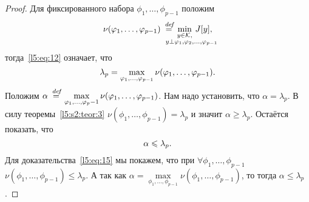 \documentclass[12pt,a4paper,openany,fleqn]{book}
\newcommand {\defeq}{\stackrel{\hspace{0.09 cm}de\!f}{=}}
\newcommand {\eqdef}{\defeq}
\newcommand{\mc}[1]{\ensuremath{\mathcal{#1}}}
\newcommand{\K}{\mc{K}}
\theoremstyle{definition}
\begin{document}
\begin{proof}
	Для фиксированного набора $\phi_1,\ldots,\phi_{p-1}$ положим
	\begin{equation}
		\label{l5:eq:13}
		\hfill\nu(\phi_1,\ldots,\phi_{p-1})\eqdef\min\limits_{\substack{y\in\K,\\\lefteqn{\scriptstyle \hspace*{-0.8cm}y\perp\phi_1,\phi_2,\ldots,\phi_{p-1}}}}\,J[y],\hfill
	\end{equation}
тогда~\eqref{l5:eq:12} означает, что
\begin{equation}
	\label{l5:eq:14}
	\hfill\lambda_p=\max\limits_{\phi_1,\ldots,\phi_{p-1}}\nu(\phi_1,\ldots,\phi_{p-1}).\hfill
\end{equation}
Положим $\displaystyle\alpha\eqdef\max\limits_{\phi_1,\ldots,\phi_p-1}\nu(\phi_1,\ldots,\phi_{p-1})$. Нам надо установить, что $\alpha=\lambda_p$. В силу теоремы~\ref{l5:s2:teor:3} $\nu(\phi_1,\ldots,\phi_{p-1})=\lambda_p$ и значит $\alpha\geqslant\lambda_p$. Остаётся показать, что
\begin{equation}
	\label{l5:eq:15}
	\hfill\alpha\leqslant\lambda_p.\hfill
\end{equation} 
Для доказательства~\eqref{l5:eq:15} мы покажем, что при $\forall\phi_1,\ldots,\phi_{p-1}$  $\nu(\phi_1,\ldots,\phi_{p-1})\leqslant\lambda_p$. А так как $\alpha=\max\limits_{\phi_1,\ldots,\phi_{p-1}}\nu(\phi_1,\ldots,\phi_{p-1})$, то тогда $\alpha\leqslant\lambda_p$.


\end{proof}
\end{document}
